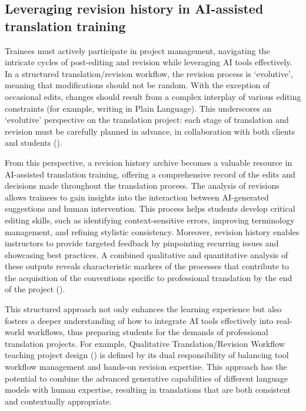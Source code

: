 \documentclass[output=paper]{langscibook}
\begin{document}
\subsection{Leveraging revision history in AI-assisted translation training}
Trainees must actively participate in project management, navigating the intricate cycles of post-editing and revision while leveraging AI tools effectively. In a structured translation/revision workflow, the revision process is ‘evolutive’, meaning that modifications should not be random. With the exception of occasional edits, changes should result from a complex interplay of various editing constraints (for example, writing in Plain Language). This underscores an ‘evolutive’ perspective on the translation project: each stage of translation and revision must be carefully planned in advance, in collaboration with both clients and students (\citealt{gledhillzimina23}).

From this perspective, a revision history archive becomes a valuable resource in AI-assisted translation training, offering a comprehensive record of the edits and decisions made throughout the translation process. The analysis of revisions allows trainees to gain insights into the interaction between AI-generated suggestions and human intervention. This process helps students develop critical editing skills, such as identifying context-sensitive errors, improving terminology management, and refining stylistic consistency. Moreover, revision history enables instructors to provide targeted feedback by pinpointing recurring issues and showcasing best practices. A combined qualitative and quantitative analysis of these outputs reveals characteristic markers of the processes that contribute to the acquisition of the conventions specific to professional translation by the end of the project (\citealt{ziminagledhill23}).

This structured approach not only enhances the learning experience but also fosters a deeper understanding of how to integrate AI tools effectively into real-world workflows, thus preparing students for the demands of professional translation projects. For example, Qualitative Translation/Revision Workflow teaching project design (\citealt{gledhillzimina23}) is defined by its dual responsibility of balancing tool workflow management and hands-on revision expertise. This approach has the potential to combine the advanced generative capabilities of different language models with human expertise, resulting in translations that are both consistent and contextually appropriate.
\end{document}
